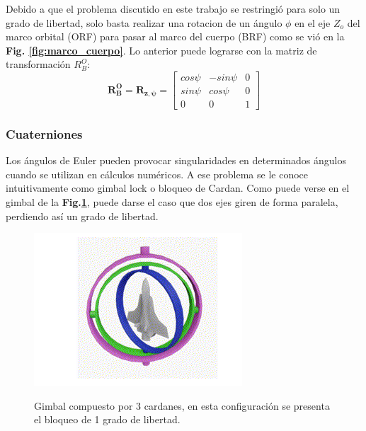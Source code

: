  Debido a que el problema discutido en este trabajo se restringió para solo un grado de libertad, solo basta realizar una rotacion de un ángulo $\phi$ en el eje $Z_o$ del marco orbital (ORF) para pasar al marco del cuerpo (BRF) como se vió en la  \textbf{Fig. \ref{fig:marco_cuerpo}}. Lo anterior puede lograrse con la matriz de transformación $R_{B}^{O}$:
$$
\mathbf{R_{B}^{O}}=\mathbf{R_{z,\psi}}=\left[\begin{array}{ccc}
	cos\psi & -sin\psi & 0 \\
	sin\psi & cos\psi & 0 \\
	0 & 0 & 1
\end{array}\right]
$$


\subsubsection{Cuaterniones}
\hfill \break
Los ángulos de Euler pueden provocar singularidades en determinados ángulos cuando se utilizan en cálculos numéricos. A ese problema se le conoce intuitivamente como gimbal lock o bloqueo de Cardan. Como puede verse en el gimbal de la \textbf{Fig.\ref{fig:gimbal}}, puede darse el caso que dos ejes giren de forma paralela, perdiendo así un grado de libertad.

\begin{figure}[!ht]
	\begin{center}
		\includegraphics[scale=0.8]{imagenes/marco_teorico/gimbal.PNG}\\
	\end{center}
	\caption{ Gimbal compuesto por 3 cardanes, en esta configuración se presenta el bloqueo de 1 grado de libertad. }
	\label{fig:gimbal}
\end{figure}

